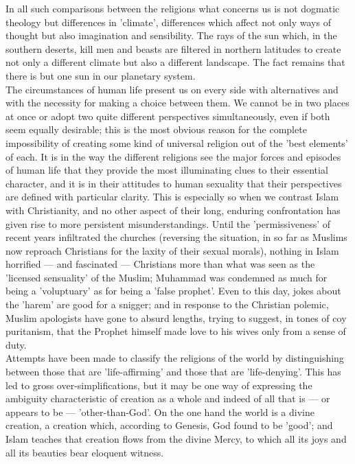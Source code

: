 \documentclass[10pt, twoside,openright]{book}
\begin{document}
In all such comparisons between the religions what concerns us is not dogmatic theology but 
differences in 'climate', differences which affect not only ways of thought but also imagination and 
sensibility. The rays of the sun which, in the southern deserts, kill men and beasts are filtered in 
northern latitudes to create not only a different climate but also a different landscape. The fact 
remains that there is but one sun in our planetary system. \\

The circumstances of human life present us on every side with alternatives and with the necessity for 
making a choice between them. We cannot be in two places at once or adopt two quite different 
perspectives simultaneously, even if both seem equally desirable; this is the most obvious reason for 
the complete impossibility of creating some kind of universal religion out of the 'best elements' of 
each. It is in the way the different religions see the major forces and episodes of human life that 
they provide the most illuminating clues to their essential character, and it is in their attitudes 
to human sexuality that their perspectives are defined with particular clarity. This is especially so 
when we contrast Islam with Christianity, and no other aspect of their long, enduring confrontation 
has given rise to more persistent misunderstandings. Until the 'permissiveness' of recent years 
infiltrated the churches (reversing the situation, in so far as Muslims now reproach Christians for 
the laxity of their sexual morals), nothing in Islam horrified --- and fascinated --- Christians more 
than what was seen as the 'licensed sensuality' of the Muslim; Muhammad was condemned as much for 
being a 'voluptuary' as for being a 'false prophet'. Even to this day, jokes about the 'harem' are 
good for a snigger; and in response to the Christian polemic, Muslim apologists have gone to absurd 
lengths, trying to suggest, in tones of coy puritanism, that the Prophet himself made love to his 
wives only from a sense of duty. \\

Attempts have been made to classify the religions of the world by distinguishing between those that 
are 'life\hyp{}affirming' and those that are 'life\hyp{}denying'. This has led to gross over\hyp{}simplifications, 
but it may be one way of expressing the ambiguity characteristic of creation as a whole and indeed of 
all that is --- or appears to be --- 'other\hyp{}than\hyp{}God'. On the one hand the world is a divine creation, a 
creation which, according to Genesis, God found to be 'good'; and Islam teaches that creation flows 
from the divine Mercy, to which all its joys and all its beauties bear eloquent witness. \\
\end{document}
